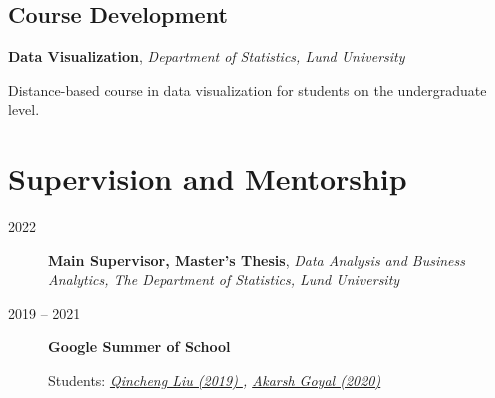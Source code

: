 \documentclass[
  10pt,
  headsepline=true,
  english,
  DIV=12
]{scrartcl}
\renewcommand*{%
  \mkbibnamegiven
}[1]{\ifitemannotation{highlight}{\textbf{#1}}{#1}}
\renewcommand*{%
  \mkbibnamefamily
}[1]{\ifitemannotation{highlight}{\textbf{#1}}{#1}}
\begin{document}
\subsection{Course Development}

\begin{description}[
    labelwidth = \widthof{2020} + 1em,
    leftmargin = \widthof{2020} + 1em,
  ]

  \item[2020]{
              \textbf{Data Visualization}, \emph{Department of Statistics, Lund
                University}

              Distance-based course in data visualization for students on
              the undergraduate level.
        }
\end{description}

\section{Supervision and Mentorship}

\begin{description}
  \item[2022] {
    \textbf{Main Supervisor, Master's Thesis}, \emph{Data Analysis and
      Business Analytics, The Department of Statistics, Lund University}

    }
    \item[2019 -- 2021]{
                \textbf{Google Summer of School}

                Students:
                \emph{
                  \href{
                    https://summerofcode.withgoogle.com/archive/2019/projects/4654960430546944/
                  }{
                    Qincheng Liu (2019)
                  },
                  \href{
                    https://summerofcode.withgoogle.com/dashboard/project/5459519376719872/overview
                  }{
                    Akarsh Goyal (2020)
                  }
                } }


\end{description}
\end{document}
